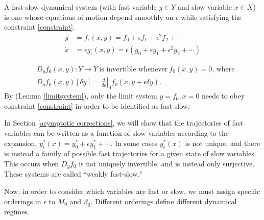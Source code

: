 \documentclass{article}
\newcommand{\ep}{\epsilon}
\newcommand{\pth} [1] {\left( #1 \right) }
\begin{document}
A fast-slow dynamical system (with fast variable $y\in Y$ and slow variable $x\in X$) is one whose equations of motion depend smoothly on $\ep$ while satisfying the constraint \eqref{constraint}. 
\begin{equation} \label{fastslow} \begin{split}
    \dot{y} &= f_\ep(x,y) = f_0 + \ep f_1 + \ep^2 f_2 + \cdots \\ \dot{x} &= \ep g_\ep(x,y) = \ep \pth{g_0 + \ep g_1 + \ep^2 g_2 + \cdots} 
\end{split} \end{equation}

\begin{equation} \label{constraint} \begin{split}
    &D_yf_0(x,y): Y \rightarrow Y \ \text{is invertible whenever}\ f_0(x,y)=0 \text{, where} \\
    &D_yf_0(x,y)[\delta y] = \left. \frac{d}{d\ep} \right|_0 f_0(x,y+\ep\delta y).
\end{split} \end{equation}
By (Lemma \ref{limitsystem}), only the limit system $\dot{y}=f_0,\dot{x}=0$ needs to obey constraint \eqref{constraint} in order to be identified as fast-slow. 

In Section \ref{asymptotic corrections}, we will show that the trajectories of fast variables can be written as a function of slow variables according to the expansion, $y^*_\ep(x) = y^*_0 + \ep y^*_1 + \cdots$. In some cases $y^*_\ep(x)$ is not unique, and there is instead a family of possible fast trajectories for a given state of slow variables. This occurs when $D_yf_0$ is not uniquely invertible, and is instead only surjective. These systems are called ``weakly fast-slow." 

Now, in order to consider which variables are fast or slow, we must assign specific orderings in $\ep$ to $M_0$ and $\beta_0$. Different orderings define different dynamical regimes. 
\end{document}
